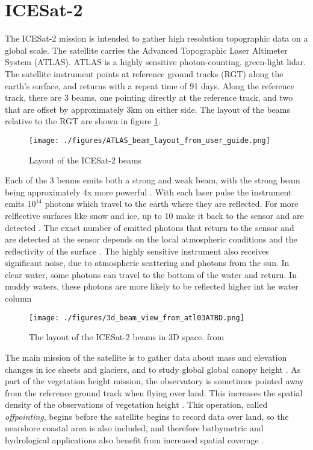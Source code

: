 \section{ICESat-2}

The ICESat-2 mission is intended to gather high resolution topographic data on a global scale. The satellite carries the Advanced Topographic Laser Altimeter System (ATLAS). ATLAS is a highly sensitive photon-counting, green-light lidar. The satellite instrument points at reference ground tracks (RGT) along the earth's surface, and returns with a repeat time of 91 days. Along the reference track, there are 3 beams, one pointing directly at the reference track, and two that are offset by approximately 3km on either side. The layout of the beams relative to the RGT are shown in figure \ref{fig:icesat-rgts}.

\begin{figure}[h!]
      \centering
      \texttt{[image: ./figures/ATLAS\_beam\_layout\_from\_user\_guide.png]}
      \caption{Layout of the ICESat-2 beams}
      \label{fig:icesat-rgts}
\end{figure}

Each of the 3 beams emits both a strong and weak beam, with the strong beam being approximately 4x more powerful \parencite{Neumann2019d}. With each laser pulse the instrument emits \(10^{14}\) photons which travel to the earth where they are reflected. For more relflective surfaces like snow and ice, up to 10 make it back to the sensor and are detected \parencite{Neumann2019d}. The exact number of emitted photons that return to the sensor and are detected at the sensor depends on the local atmospheric conditions and the reflectivity of the surface \parencite{Neumann2019e}. The highly sensitive instrument also receives significant noise, due to atmospheric scattering and photons from the sun. In clear water, some photons can travel to the bottom of the water and return. In muddy waters, these photons are more likely to be reflected higher int he water column \parencite{Ranndal2021}

\begin{figure}[htbp]
      \centering
      \texttt{[image: ./figures/3d\_beam\_view\_from\_atl03ATBD.png]}
      \caption{The layout of the ICESat-2 beams in 3D space. from \cite{Neumann2019d}}
      \label{3d-beams}
\end{figure}


The main mission of the satellite is to gather data about mass and elevation changes in ice sheets and glaciers, and to study global global canopy height \parencite{Markus2017}. As part of the vegetation height mission, the observatory is sometimes pointed away from the reference ground track when flying over land. This increases the spatial density of the observations of vegetation height \parencite{Markus2017}. This operation, called  \emph{offpointing}, begins before the satellite begins to record data over land, so the nearshore coastal area is also included, and therefore bathymetric and hydrological applications also benefit from increased spatial coverage \parencite{Magruder2021}.

